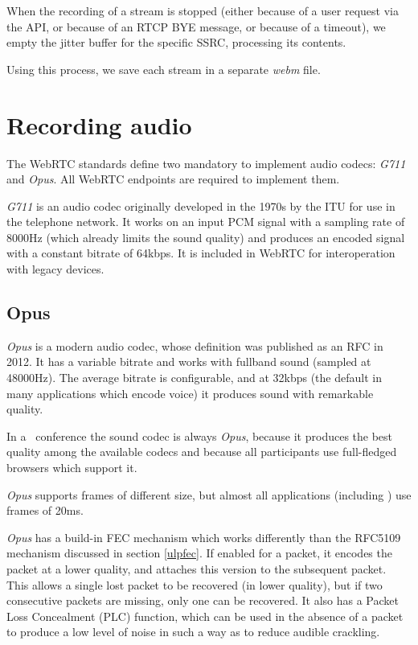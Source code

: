 \documentclass[twoside,openright,a4paper,12pt,english]{article}
\begin{document}
When the recording of a stream is stopped (either because of a user request
via the API, or because of an RTCP BYE message, or because of a
timeout), we empty the jitter buffer for the specific SSRC, processing its contents.

Using this process, we save each stream in a 
separate \emph{webm} file.




\section{Recording audio}
\label{recording-audio}
The WebRTC standards define two mandatory to implement audio codecs:
\emph{G711}\cite{g711} and \emph{Opus}\cite{opus}. All WebRTC endpoints are
required to implement them.

\emph{G711} is an audio codec originally developed in the 1970s by the ITU for
use in the telephone network. It works on an input PCM signal with a sampling
rate of 8000Hz (which already limits the sound quality) and produces an encoded
signal with a constant bitrate of 64kbps. It is included in WebRTC for interoperation
with legacy devices.

\subsection{Opus}
\emph{Opus} is a modern audio codec, whose definition was published as an RFC in 2012. It has a variable bitrate
and works with fullband sound (sampled at 48000Hz). The average bitrate is configurable,
and at 32kbps (the default in many applications which encode voice) it produces
sound with remarkable quality.

In a \jm\ conference the sound codec is always \emph{Opus}, because
it produces the best quality among the available codecs and because
all participants use full-fledged browsers which support it.

\emph{Opus} supports frames of different size, but almost all applications (including \wrtc) use frames of 20ms. 

\emph{Opus} has a build-in FEC mechanism which works differently than the
RFC5109 mechanism discussed in section \ref{ulpfec}. If enabled for a packet,
it encodes the packet at a lower quality, and attaches this
version to the subsequent packet. This allows a single lost packet to be
recovered (in lower quality), but if two consecutive packets are missing, only
one can be recovered. It also has a Packet Loss Concealment (PLC) function, which
can be used in the absence of a packet to produce a low level of noise in such
a way as to reduce audible crackling.
\end{document}
